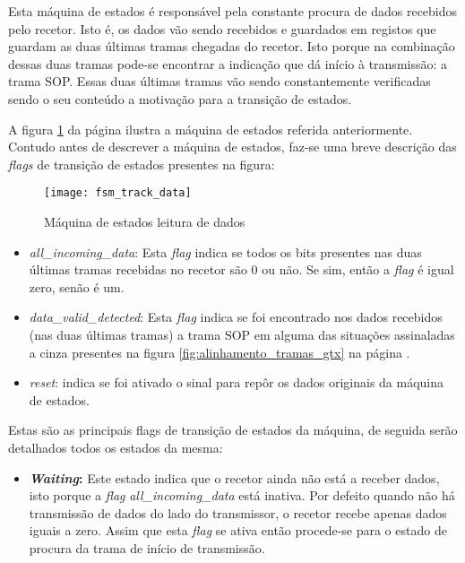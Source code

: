 \begin{enumerate}
	 Esta máquina de estados é responsável pela constante procura de dados recebidos pelo recetor. Isto é, os dados vão sendo recebidos e guardados em registos que guardam as duas últimas tramas chegadas do recetor. Isto porque na combinação dessas duas tramas pode-se encontrar a indicação que dá início à transmissão: a trama SOP. Essas duas últimas tramas vão sendo constantemente verificadas sendo o seu conteúdo a motivação para a transição de estados. %
	 
	 A figura \ref{fig:fsm2} da página \pageref{fig:fsm2} ilustra a máquina de estados referida anteriormente. Contudo antes de descrever a máquina de estados, faz-se uma breve descrição das \textit{flags} de transição de estados presentes na figura:
	 

	 	\begin{figure}[h!]
	 		\begin{center}
	 			\leavevmode
	 			\texttt{[image: fsm\_track\_data]}
	 			\captionsetup{width=1.0\linewidth}
	 			\caption[Máquina de estados leitura de dados]{Máquina de estados leitura de dados}
	 			\label{fig:fsm2}
	 		\end{center}
		\end{figure}
	 
	\begin{itemize}
		\item \textit{all\_incoming\_data}: Esta \textit{flag} indica se todos os bits presentes nas duas últimas tramas recebidas no recetor são 0 ou não. Se sim, então a \textit{flag} é igual zero, senão é um.
		
		\item \textit{data\_valid\_detected}: Esta \textit{flag} indica se foi encontrado nos dados recebidos (nas duas últimas tramas) a trama SOP em alguma das situações assinaladas a cinza presentes na figura \ref{fig:alinhamento_tramas_gtx} na página \pageref{fig:alinhamento_tramas_gtx}.
		
		\item \textit{reset}: indica se foi ativado o sinal para repôr os dados originais da máquina de estados.
	\end{itemize}	 
	 
	 Estas são as principais flags de transição de estados da máquina, de seguida serão detalhados todos os estados da mesma:
	 
	 	 \begin{itemize}
	 	\item \textbf{\textit{Waiting}:} Este estado indica que o recetor ainda não está a receber dados, isto porque a \textit{flag} \textit{all\_incoming\_data} está inativa. Por defeito quando não há transmissão de dados do lado do transmissor, o recetor recebe apenas dados iguais a zero. Assim que esta \textit{flag} se ativa então procede-se para o estado de procura da trama de início de transmissão.
	 	

\end{itemize}
\end{enumerate}

